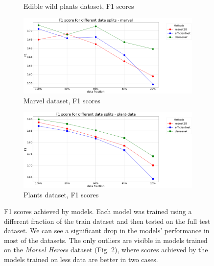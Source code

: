 \begin{figure}[h]
\begin{subfigure}{.45\textwidth}
    \caption{Edible wild plants dataset, F1 scores}\label{fig:model-scores-edible-plants}
\end{subfigure}
 \begin{subfigure}{.45\textwidth}
    \centering
    \includegraphics[width=\textwidth]{experiments/models/marvel-f1.png}
    \caption{Marvel dataset, F1 scores}\label{fig:model-scores-marvel}
\end{subfigure}
 \begin{subfigure}{.45\textwidth}
    \centering
    \includegraphics[width=\textwidth]{experiments/models/plant-data-f1.png}
    \caption{Plants dataset, F1 scores}\label{fig:model-scores-plants}
\end{subfigure}

 \caption{F1 scores achieved by models. Each model was trained using a different fraction of the train dataset and then tested on the full test dataset. We can see a significant drop in the models' performance in most of the datasets. The only outliers are visible in models trained on the \textit{Marvel Heroes} dataset (Fig. \ref{fig:model-scores-marvel}), where scores achieved by the models trained on less data are better in two cases.}\label{fig:model-scores}
\end{figure}

\vspace{\baselineskip}

